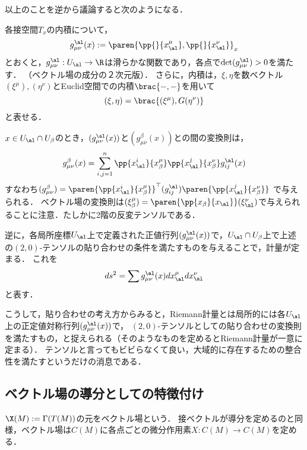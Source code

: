 \documentclass[uplatex,dvipdfmx]{jsreport}
\begin{document}
以上のことを逆から議論すると次のようになる．

\begin{notation}
    各接空間$T_x$の内積について，
    \[g_{\mu\nu}^\al(x):=\paren{\pp{}{x_\al^\mu},\pp{}{x^\nu_\al}}_x\]
    とおくと，$g_{\mu\nu}^\al:U_\al\to\R$は滑らかな関数であり，各点で$\det(g^\al_{\mu\nu})>0$を満たす．
    （ベクトル場の成分の２次元版）．
    さらに，内積は，$\xi,\eta$を数ベクトル$(\xi^\mu),(\eta^\nu)$とEuclid空間での内積$\brac{-,-}$を用いて
    \[(\xi,\eta)=\brac{(\xi^\mu),G(\eta^\nu)}\]
    と表せる．

    $x\in U_\al\cap U_\beta$のとき，$(g_{\mu\nu}^\al(x))$と$(g_{\mu\nu}^\beta(x))$との間の変換則は，
    \[g_{\mu\nu}^\beta(x)=\sum^n_{i,j=1}\pp{x_\al^i}{x_\beta^\mu}\pp{x_\al^j}{x^\nu_\beta}g_{ij}^\al(x)\]
    すなわち$(g^\beta_{\mu\nu})=\paren{\pp{x^i_\al}{x^\mu_\beta}}^\top(g_{ij}^\al)\paren{\pp{x^j_\al}{x_\beta^\nu}}$
    で与えられる．
    ベクトル場の変換則は$(\xi_\beta^\mu)=\paren{\pp{x_\beta}{x_\al}}(\xi_\al^\nu)$で与えられることに注意．たしかに2階の反変テンソルである．

    逆に，各局所座標$U_\al$上で定義された正値行列$(g_{\mu\nu}^\al(x))$で，$U_\al\cap U_\beta$上で上述の$(2,0)$-テンソルの貼り合わせの条件を満たすものを与えることで，計量が定まる．
    これを
    \[ds^2=\sum g_{\mu\nu}^\al(x)dx^\mu_\al dx_\al^\nu\]
    と表す．
\end{notation}
\begin{remarks}
    こうして，貼り合わせの考え方からみると，Riemann計量とは局所的には各$U_\al$上の正定値対称行列$(g_{\mu\nu}^\al(x))$で，
    $(2,0)$-テンソルとしての貼り合わせの変換則を満たすもの，と捉えられる（そのようなものを定めるとRiemann計量が一意に定まる）．
    テンソルと言ってもビビらなくて良い，大域的に存在するための整合性を満たすというだけの消息である．
\end{remarks}

\subsection{ベクトル場の導分としての特徴付け}

\begin{definition}
    $\X(M):=\Gamma(T(M))$の元をベクトル場という．
    接ベクトルが導分を定めるのと同様，ベクトル場は$C(M)$に各点ごとの微分作用素$X:C(M)\to C(M)$を定める．
\end{definition}
\end{document}
